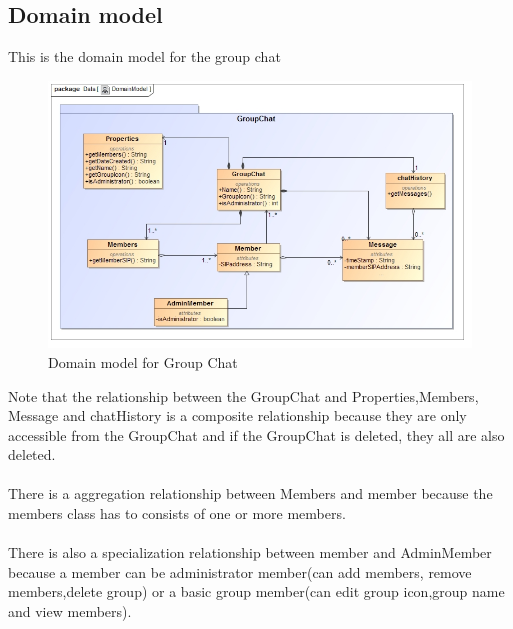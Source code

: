 \documentclass[a4paper]{article}
\begin{document}
\subsection{Domain model}
This is the domain model for the group chat
\begin{figure}[H]
\centering
\includegraphics[width=1\linewidth]{./pictures/DomainModel.jpg}
\caption{Domain model for Group Chat}
\end{figure}

Note that the relationship between the GroupChat and Properties,Members, Message and chatHistory is a composite relationship because they are only accessible from the GroupChat and if the GroupChat is deleted, they all are also deleted.\\
\\
There is a aggregation relationship between Members and member because the members class has to consists of one or more members. \\
\\
There is also a specialization relationship between member and AdminMember because a member can be administrator member(can add members, remove members,delete group) or a basic group member(can edit group icon,group name and view members).
\end{document}
